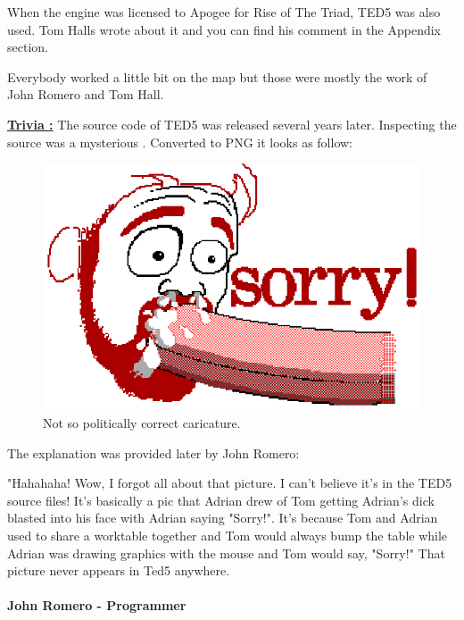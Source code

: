 \documentclass[book.tex]{subfiles}
\begin{document}
 When the engine was licensed to Apogee for Rise of The Triad, TED5 was also used. Tom Halls wrote about it and you can find his comment in the Appendix section.\\
\par
Everybody worked a little bit on the map but those were mostly the work of John Romero and Tom Hall.\\
\par
 \textbf{\underline{Trivia :}} The source code of TED5 was released several years later. Inspecting the source was a mysterious . Converted to PNG it looks as follow:\\
\begin{figure}[H]
\centering
 \includegraphics[width=\textwidth]{imgs/_tom.eps}
 \caption{Not so politically correct caricature.} 
 \end{figure}
The explanation was provided later by John Romero:\\
 \begin{fancyquotes}
   "Hahahaha! Wow, I forgot all about that picture. I can't believe it's 
in the TED5 source files! It's basically a pic that Adrian drew of Tom 
getting Adrian's dick blasted into his face with Adrian saying "Sorry!". 
It's because Tom and Adrian used to share a worktable together and Tom 
would always bump the table while Adrian was drawing graphics with the 
mouse and Tom would say, "Sorry!" That picture never appears in Ted5 
anywhere.\\
   \\
\textbf{John Romero - Programmer}
 \end{fancyquotes}\\
\end{document}
